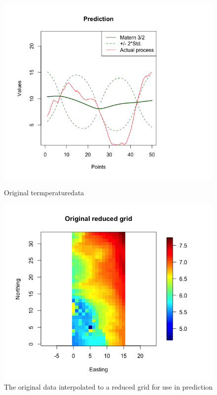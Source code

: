 \begin{figure}[!htb]
   \begin{minipage}{0.475\textwidth}
     \centering
     \includegraphics[width=1.25\linewidth]{figurer/prediction_325.png}
        \caption{Original termperaturedata}
        \label{fig:data_original}
   \end{minipage}
   \begin {minipage}{0.44\textwidth}
     \centering
     \includegraphics[width=1.3\linewidth]{figurer/original_reduced.png}
     \caption{The original data interpolated to a reduced grid for use in prediction}
	 \label{fig:data_original_reduced}
   \end{minipage}
\end{figure}

